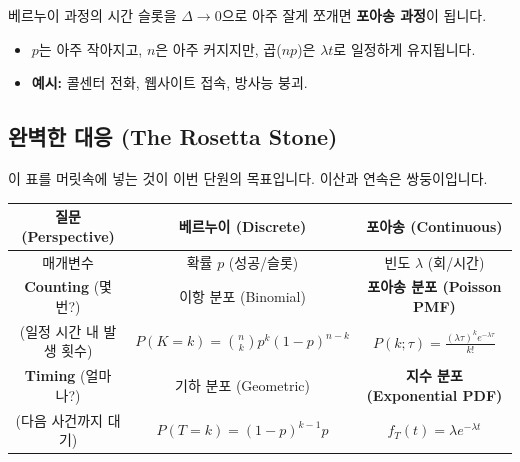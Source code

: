 \documentclass[11pt,a4paper]{book}
\theoremstyle{definition}
\begin{document}
베르누이 과정의 시간 슬롯을 $\Delta \to 0$으로 아주 잘게 쪼개면 \textbf{포아송 과정}이 됩니다.
\begin{itemize}
    \item $p$는 아주 작아지고, $n$은 아주 커지지만, 곱($np$)은 $\lambda t$로 일정하게 유지됩니다.
    \item \textbf{예시:} 콜센터 전화, 웹사이트 접속, 방사능 붕괴.
\end{itemize}

\subsection{완벽한 대응 (The Rosetta Stone)}
이 표를 머릿속에 넣는 것이 이번 단원의 목표입니다. 이산과 연속은 쌍둥이입니다.

\begin{center}

\begin{tabular}{c|c|c}
\toprule
\rowcolor{subgray} \textbf{질문 (Perspective)} & \textbf{베르누이 (Discrete)} & \textbf{포아송 (Continuous)} \\ \midrule
매개변수 & 확률 $p$ (성공/슬롯) & 빈도 $\lambda$ (회/시간) \\ \hline
\textbf{Counting} (몇 번?) & 이항 분포 (Binomial) & \textbf{포아송 분포 (Poisson PMF)} \\ 
(일정 시간 내 발생 횟수) & $P(K=k) = \binom{n}{k}p^k(1-p)^{n-k}$ & $P(k; \tau) = \frac{(\lambda \tau)^k e^{-\lambda \tau}}{k!}$ \\ \hline
\textbf{Timing} (얼마나?) & 기하 분포 (Geometric) & \textbf{지수 분포 (Exponential PDF)} \\
(다음 사건까지 대기) & $P(T=k) = (1-p)^{k-1}p$ & $f_T(t) = \lambda e^{-\lambda t}$ \\ \bottomrule
\end{tabular}
\end{center}
\end{document}

